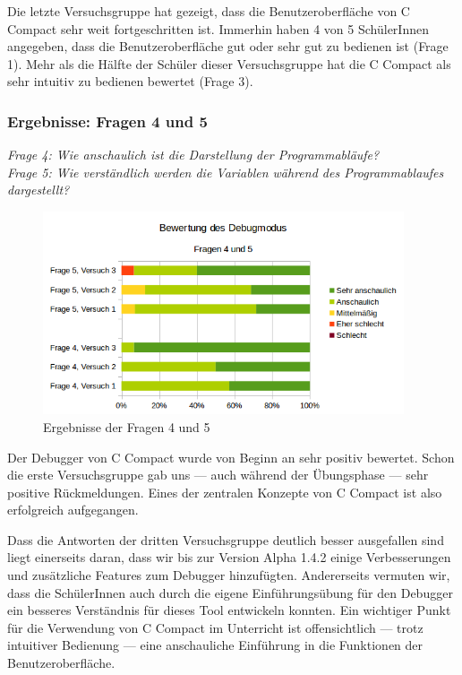 Die letzte Versuchsgruppe hat gezeigt, dass die Benutzeroberfläche von C Compact sehr weit fortgeschritten ist. Immerhin haben 4 von 5 SchülerInnen angegeben, dass die Benutzeroberfläche \glqq{}gut\grqq{} oder \glqq{}sehr gut\grqq{} zu bedienen ist (Frage 1). Mehr als die Hälfte der Schüler dieser Versuchsgruppe hat die C Compact als \glqq{}sehr intuitiv zu bedienen\grqq{} bewertet (Frage 3).

\subsubsection*{Ergebnisse: Fragen 4 und 5}

\emph{Frage 4: Wie anschaulich ist die Darstellung der Programmabläufe?\\
Frage 5: Wie verständlich werden die Variablen während des Programmablaufes dargestellt?}

\begin{figure}[h!]
\centering
\includegraphics[width=0.95\textwidth]{./media/images/gui/trials/gui-f4-5.png}
\caption{Ergebnisse der Fragen 4 und 5}
\end{figure}

Der Debugger von C Compact wurde von Beginn an sehr positiv bewertet. Schon die erste Versuchsgruppe gab uns --- auch während der Übungsphase --- sehr positive Rückmeldungen. Eines der zentralen Konzepte von C Compact ist also erfolgreich aufgegangen.

Dass die Antworten der dritten Versuchsgruppe deutlich besser ausgefallen sind liegt einerseits daran, dass wir bis zur Version Alpha 1.4.2 einige Verbesserungen und zusätzliche Features zum Debugger hinzufügten. Andererseits vermuten wir, dass die \mbox{SchülerInnen} auch durch die eigene Einführungsübung für den Debugger ein besseres Verständnis für dieses Tool entwickeln konnten. Ein wichtiger Punkt für die Verwendung von C Compact im Unterricht ist offensichtlich --- trotz intuitiver Bedienung --- eine anschauliche Einführung in die Funktionen der Benutzeroberfläche.

